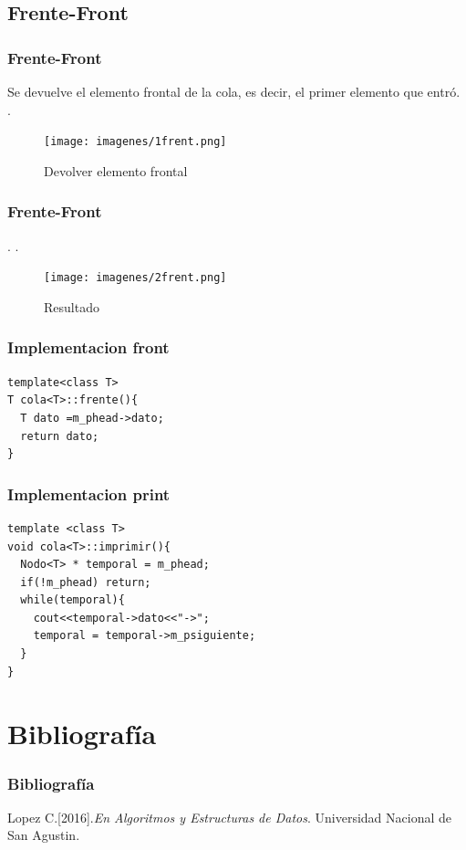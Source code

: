 \documentclass{beamer}
\begin{document}
\subsection{Frente-Front}
    \begin{frame}
      \frametitle{Frente-Front}
      Se devuelve el elemento frontal de la cola, es decir, el primer elemento que entró.\\ 
      .\\
      
      \begin{figure}
  \texttt{[image: imagenes/1frent.png]}
     \caption{Devolver elemento frontal}
     \end{figure}
      
    \end{frame}
    \begin{frame}
      \frametitle{Frente-Front}
.
      .\\
      \begin{figure}
  \texttt{[image: imagenes/2frent.png]}
    \caption{Resultado}
    \end{figure}
    
    \end{frame}




\begin{frame}[fragile]
\frametitle{Implementacion front}
\begin{verbatim}
template<class T>
T cola<T>::frente(){
  T dato =m_phead->dato;
  return dato;
}

\end{verbatim}
\end{frame}


\begin{frame}[fragile]
\frametitle{Implementacion print}
\begin{verbatim}
template <class T>
void cola<T>::imprimir(){
  Nodo<T> * temporal = m_phead;
  if(!m_phead) return;
  while(temporal){
    cout<<temporal->dato<<"->";
    temporal = temporal->m_psiguiente;
  }
}
\end{verbatim}
\end{frame}



\section{Bibliografía}
\begin{frame}
\frametitle{Bibliografía}
\begin{thebibliography}{99}

 Lopez C.[2016].\emph{En Algoritmos y Estructuras de Datos}. Universidad Nacional de San Agustin.

\end{thebibliography}
\end{frame}
\end{document}
